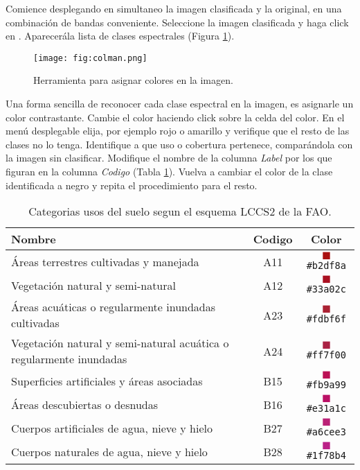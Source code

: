 Comience desplegando en simultaneo la imagen clasificada y la original, en una combinación de bandas conveniente. Seleccione la imagen clasificada y haga click en . Aparecerála lista de clases espectrales (Figura \ref{fig:colman}).

\begin{figure}[h!]
    \centering
    \texttt{[image: fig:colman.png]}
    \caption{Herramienta para asignar colores en la imagen.}
    \label{fig:colman}
\end{figure}

Una forma sencilla de reconocer cada clase espectral en la imagen, es asignarle un color contrastante. Cambie el color haciendo click sobre la celda del color. En el menú desplegable elija, por ejemplo rojo o amarillo y verifique que el resto de las clases no lo tenga. Identifique a que uso o cobertura pertenece, comparándola con la imagen sin clasificar. Modifique el nombre de la columna \emph{Label} por los que figuran en la columna \emph{Codigo} (Tabla \ref{tab:usos}). Vuelva a cambiar el color de la clase identificada a negro y repita el procedimiento para el resto.

\begin{table}[hbt]
    \centering
    \begin{tabular}{p{11cm}cc}
        \toprule
        Nombre & Codigo & Color \\
        \midrule
        Áreas terrestres cultivadas y manejada & A11 & \textcolor{A11}{$\blacksquare$}\texttt{\#b2df8a}
        \\
        Vegetación natural y semi-natural & A12 & \textcolor{A12}{$\blacksquare$}\texttt{\#33a02c}\\
        Áreas acuáticas o regularmente inundadas cultivadas & A23  &
        \textcolor{A23}{$\blacksquare$}\texttt{\#fdbf6f}\\
        Vegetación natural y semi-natural acuática o
	regularmente inundadas & A24 & \textcolor{A24}{$\blacksquare$}\texttt{\#ff7f00}\\
        Superficies artificiales y áreas asociadas & B15  &
        \textcolor{B15}{$\blacksquare$}\texttt{\#fb9a99}\\
        Áreas descubiertas o desnudas & B16 & \textcolor{B16}{$\blacksquare$}\texttt{\#e31a1c}\\
        Cuerpos artificiales de agua, nieve y hielo & B27 &
        \textcolor{B27}{$\blacksquare$}\texttt{\#a6cee3}\\
        Cuerpos naturales de agua, nieve y hielo & B28&
        \textcolor{B28}{$\blacksquare$}\texttt{\#1f78b4}\\
        \bottomrule
    \end{tabular}
\caption{\label{tab:usos}Categorias usos del suelo segun el esquema LCCS2 de la FAO.}
\end{table}

